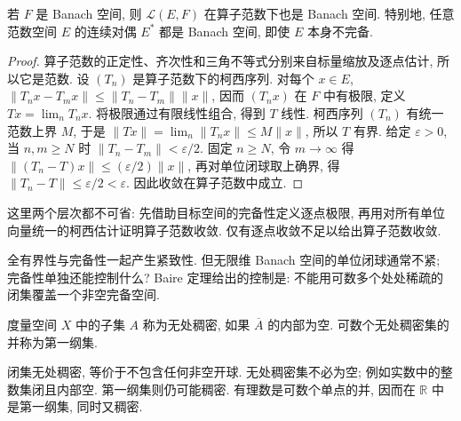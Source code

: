 \begin{theorem}\label{thm:operator-banach}
若 $F$ 是 Banach 空间, 则 $\mathcal L(E,F)$ 在算子范数下也是 Banach 空间. 特别地, 任意范数空间 $E$ 的连续对偶 $E^*$ 都是 Banach 空间, 即使 $E$ 本身不完备.
\end{theorem}
\begin{proof}
算子范数的正定性、齐次性和三角不等式分别来自标量缩放及逐点估计, 所以它是范数. 设 $(T_n)$ 是算子范数下的柯西序列. 对每个 $x\in E$,
$\lVert T_nx-T_mx\rVert\le\lVert T_n-T_m\rVert\lVert x\rVert$, 因而 $(T_nx)$ 在 $F$ 中有极限, 定义 $Tx=\lim_n T_nx$. 将极限通过有限线性组合, 得到 $T$ 线性. 柯西序列 $(T_n)$ 有统一范数上界 $M$, 于是 $\lVert Tx\rVert=\lim_n\lVert T_nx\rVert\le M\lVert x\rVert$, 所以 $T$ 有界. 给定 $\varepsilon>0$, 当 $n,m\ge N$ 时 $\lVert T_n-T_m\rVert<\varepsilon/2$. 固定 $n\ge N$, 令 $m\to\infty$ 得 $\lVert(T_n-T)x\rVert\le(\varepsilon/2)\lVert x\rVert$, 再对单位闭球取上确界, 得 $\lVert T_n-T\rVert\le\varepsilon/2<\varepsilon$. 因此收敛在算子范数中成立.
\end{proof}
这里两个层次都不可省: 先借助目标空间的完备性定义逐点极限, 再用对所有单位向量统一的柯西估计证明算子范数收敛. 仅有逐点收敛不足以给出算子范数收敛.

全有界性与完备性一起产生紧致性. 但无限维 Banach 空间的单位闭球通常不紧; 完备性单独还能控制什么? Baire 定理给出的控制是: 不能用可数多个处处稀疏的闭集覆盖一个非空完备空间.

\begin{definition}
度量空间 $X$ 中的子集 $A$ 称为无处稠密, 如果 $\overline A$ 的内部为空. 可数个无处稠密集的并称为第一纲集.
\end{definition}
闭集无处稠密, 等价于不包含任何非空开球. 无处稠密集不必为空; 例如实数中的整数集闭且内部空. 第一纲集则仍可能稠密. 有理数是可数个单点的并, 因而在 $\mathbb R$ 中是第一纲集, 同时又稠密.

